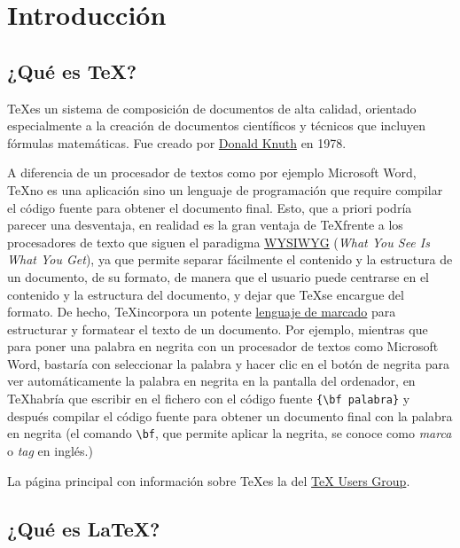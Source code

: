 \documentclass[
  a4paper,
]{scrreport}
\theoremstyle{definition}
\theoremstyle{remark}
\begin{document}

\chapter{Introducción}\label{introducciuxf3n}

\section{\texorpdfstring{¿Qué es \TeX?}{¿Qué es ?}}\label{quuxe9-es}

\TeX es un sistema de composición de documentos de alta calidad,
orientado especialmente a la creación de documentos científicos y
técnicos que incluyen fórmulas matemáticas. Fue creado por
\href{https://es.wikipedia.org/wiki/Donald_Knuth}{Donald Knuth} en 1978.

A diferencia de un procesador de textos como por ejemplo Microsoft Word,
\TeX no es una aplicación sino un lenguaje de programación que require
compilar el código fuente para obtener el documento final. Esto, que a
priori podría parecer una desventaja, en realidad es la gran ventaja de
\TeX frente a los procesadores de texto que siguen el paradigma
\href{https://es.wikipedia.org/wiki/WYSIWYG}{WYSIWYG} (\emph{What You
See Is What You Get}), ya que permite separar fácilmente el contenido y
la estructura de un documento, de su formato, de manera que el usuario
puede centrarse en el contenido y la estructura del documento, y dejar
que \TeX se encargue del formato. De hecho, \TeX incorpora un potente
\href{https://es.wikipedia.org/wiki/Lenguaje_de_marcado}{lenguaje de
marcado} para estructurar y formatear el texto de un documento. Por
ejemplo, mientras que para poner una palabra en negrita con un
procesador de textos como Microsoft Word, bastaría con seleccionar la
palabra y hacer clic en el botón de negrita para ver automáticamente la
palabra en negrita en la pantalla del ordenador, en \TeX habría que
escribir en el fichero con el código fuente
\texttt{\{\textbackslash{}bf\ palabra\}} y después compilar el código
fuente para obtener un documento final con la palabra en negrita (el
comando \texttt{\textbackslash{}bf}, que permite aplicar la negrita, se
conoce como \emph{marca} o \emph{tag} en inglés.)

La página principal con información sobre \TeX es la del
\href{https://www.tug.org/}{TeX Users Group}.

\section{\texorpdfstring{¿Qué es \LaTeX?}{¿Qué es ?}}\label{quuxe9-es-1}
\end{document}
